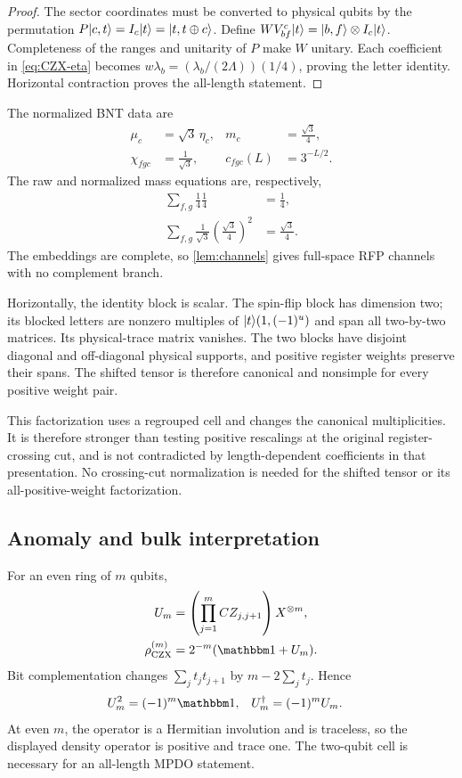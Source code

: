 \begin{proof}
	The sector coordinates must be converted to physical qubits by the
	permutation $P\lvert c,t\rangle=I_c\lvert t\rangle=\lvert t,t\oplus c\rangle$.
	Define $W V_{bf}^c\lvert t\rangle=\lvert b,f\rangle\otimes I_c\lvert t\rangle$.
	Completeness of the ranges and unitarity of $P$ make $W$ unitary.
	Each coefficient in
	\cref{eq:CZX-eta} becomes
	$w\lambda_b=(\lambda_b/(2\Lambda))(1/4)$, proving the letter
	identity. Horizontal contraction proves the all-length statement.
\end{proof}

The normalized BNT data are
\begin{align}
	\mu_c      & =\sqrt3\,\eta_c,   &
	m_c        & =\frac{\sqrt3}{4},   \\
	\chi_{fgc} & =\frac1{\sqrt3},   &
	c_{fgc}(L) & =3^{-L/2}.
\end{align}
The raw and normalized mass equations are, respectively,
\begin{align}
	\sum_{f,g}\frac14\frac14        & =\frac14,          \\
	\sum_{f,g}\frac1{\sqrt3}
	\left(\frac{\sqrt3}{4}\right)^2 & =\frac{\sqrt3}{4}.
\end{align}
The embeddings are complete, so \cref{lem:channels} gives full-space
RFP channels with no complement branch.

Horizontally, the identity block is scalar. The spin-flip block has
dimension two; its blocked letters are nonzero multiples of
$\lvert t\rangle(1,(-1)^u)$ and span all two-by-two matrices. Its
physical-trace matrix vanishes. The two blocks have disjoint diagonal
and off-diagonal physical supports, and positive register weights
preserve their spans. The shifted tensor is therefore canonical and
nonsimple for every positive weight pair.

This factorization uses a regrouped cell and changes the canonical
multiplicities. It is therefore stronger than testing positive rescalings
at the original register-crossing cut, and is not contradicted by
length-dependent coefficients in that presentation. No crossing-cut
normalization is needed for the shifted tensor or its
all-positive-weight factorization.

\subsection{Anomaly and bulk interpretation}

For an even ring of $m$ qubits,
\begin{align}
	U_m & =\left(\prod_{j=1}^mCZ_{j,j+1}\right)X^{\otimes m}, \\
	\rho_{\mathrm{CZX}}^{(m)}
	    & =2^{-m}(\Id+U_m).
\end{align}
Bit complementation changes $\sum_jt_jt_{j+1}$ by
$m-2\sum_jt_j$. Hence
\begin{align}
	U_m^2       & =(-1)^m\Id, &
	U_m^\dagger & =(-1)^mU_m.
\end{align}
At even $m$, the operator is a Hermitian involution and is traceless,
so the displayed density operator is positive and trace one.
The two-qubit cell is necessary for an all-length MPDO statement.

